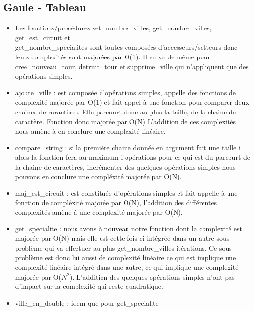 \documentclass[a4paper, 11pt, oneside]{article}
\begin{document}
\subsection{Gaule - Tableau}
\begin{itemize}
    \item Les fonctions/procédures set\_nombre\_villes, get\_nombre\_villes, get\_est\_circuit et\\ 
    get\_nombre\_specialites sont toutes composées d'accesseurs/setteurs donc leurs complexités sont 
    majorées par O(1). Il en va de même pour cree\_nouveau\_tour, detruit\_tour et supprime\_ville qui n'appliquent que 
    des opérations simples.
    \item ajoute\_ville : est composée d'opérations simples, appelle des fonctions de complexité majorée par O(1) et fait appel à une fonction pour comparer deux 
    chaines de caractères. Elle parcourt donc au plus la taille, de la chaine de caractère. Fonction donc majorée par O(N)
    L'addition de ces complexités nous amène à en conclure une complexité linéaire. 
    \item compare\_string : si la première chaine donnée en argument fait une taille i alors la fonction 
    fera au maximum i opérations pour ce qui est du parcourt de la chaine de caractères, incrémenter 
    des quelques opérations simples nous pouvons en conclure une compléxité majorée par O(N).
    \item maj\_est\_circuit : est constituée d'opérations simples et fait appelle à une fonction de compléxité 
    majorée par O(N), l'addition des différentes complexités amène à une complexité majorée par O(N).
    \item get\_specialite : nous avons à nouveau notre fonction dont la complexité est majorée par O(N) mais elle est cette fois-ci 
    intégrée dans un autre sous problème qui va effectuer au plus get\_nombre\_villes itérations. Ce sous-problème est 
    donc lui aussi de complexité linéaire ce qui est implique une complexité linéaire intégré dans une autre, ce qui 
    implique une complexité majorée par O($N^2$). L'addition des quelques opérations simples n'ont pas d'impact sur 
    la complexité qui reste quadratique.
    \item ville\_en\_double : idem que pour get\_specialite
\end{itemize}
\end{document}
